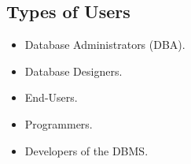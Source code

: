 \documentclass{article}
\begin{document}
    \subsection*{Types of Users}
    \begin{itemize}
        \item Database Administrators (DBA).
        \item Database Designers.
        \item End-Users.
        \item Programmers.
        \item Developers of the DBMS.
    \end{itemize}
\end{document}
